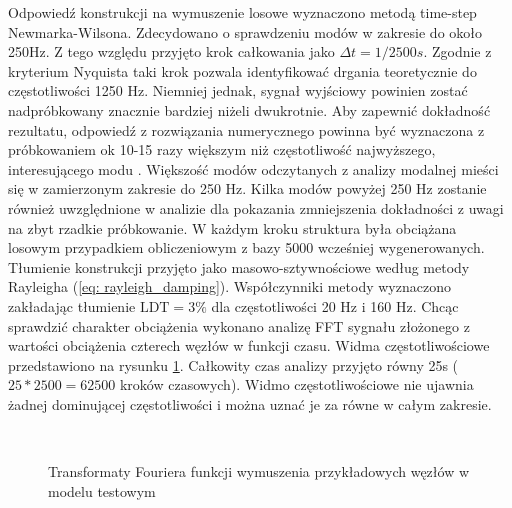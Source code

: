 Odpowiedź konstrukcji na wymuszenie losowe wyznaczono metodą time-step Newmarka-Wilsona. Zdecydowano o sprawdzeniu modów w zakresie do około 250Hz. Z tego względu przyjęto krok całkowania jako $\Delta t = 1/2500 s$. Zgodnie z kryterium Nyquista taki krok pozwala identyfikować drgania teoretycznie do częstotliwości 1250 Hz. Niemniej jednak, sygnał wyjściowy powinien zostać nadpróbkowany znacznie bardziej niżeli dwukrotnie. Aby zapewnić dokładność rezultatu, odpowiedź z rozwiązania numerycznego powinna być wyznaczona z próbkowaniem ok 10-15 razy większym niż częstotliwość najwyższego, interesującego modu \parencite{Zotowski2017c}. Większość modów odczytanych z analizy modalnej mieści się w zamierzonym zakresie do 250 Hz. Kilka modów powyżej 250 Hz zostanie również uwzględnione w analizie dla pokazania zmniejszenia dokładności z uwagi na zbyt rzadkie próbkowanie. W każdym kroku struktura była obciążana losowym przypadkiem obliczeniowym z bazy 5000 wcześniej wygenerowanych. Tłumienie konstrukcji przyjęto jako masowo-sztywnościowe według metody Rayleigha (\ref{eq: rayleigh_damping}). Współczynniki metody wyznaczono zakładając tłumienie $\text{LDT}=3\%$ dla częstotliwości 20 Hz i 160 Hz. Chcąc sprawdzić charakter obciążenia wykonano analizę FFT sygnału złożonego z wartości obciążenia czterech węzłów w funkcji czasu. Widma częstotliwościowe przedstawiono na rysunku \ref{fig: fft_load_input_blue_beam}. Całkowity czas analizy przyjęto równy 25s ($25*2500=62500$ kroków czasowych). Widmo częstotliwościowe nie ujawnia żadnej dominującej częstotliwości i można uznać je za równe w całym zakresie.
\begin{figure}[h]
	\centering
	\\
	\captionsetup{justification=centering}
	\caption{Transformaty Fouriera funkcji wymuszenia przykładowych węzłów w modelu testowym}
	\label{fig: fft_load_input_blue_beam}
\end{figure}

